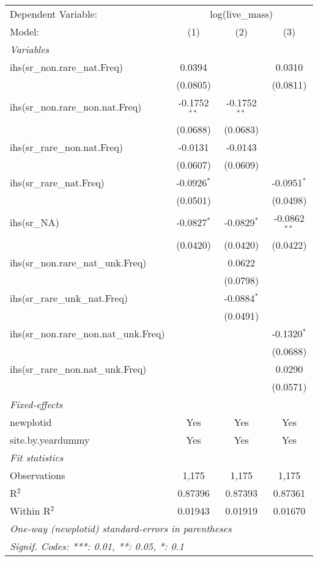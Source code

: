 \begin{tabular}{lccc}
\tabularnewline\midrule\midrule
Dependent Variable:&\multicolumn{3}{c}{log(live\_mass)}\\
Model:&(1) & (2) & (3)\\
\midrule \emph{Variables}&   &   &  \\
ihs(sr\_non.rare\_nat.Freq)&0.0394 &    & 0.0310\\
  &(0.0805) &    & (0.0811)\\
ihs(sr\_non.rare\_non.nat.Freq)&-0.1752$^{**}$ & -0.1752$^{**}$ &   \\
  &(0.0688) & (0.0683) &   \\
ihs(sr\_rare\_non.nat.Freq)&-0.0131 & -0.0143 &   \\
  &(0.0607) & (0.0609) &   \\
ihs(sr\_rare\_nat.Freq)&-0.0926$^{*}$ &    & -0.0951$^{*}$\\
  &(0.0501) &    & (0.0498)\\
ihs(sr\_NA)&-0.0827$^{*}$ & -0.0829$^{*}$ & -0.0862$^{**}$\\
  &(0.0420) & (0.0420) & (0.0422)\\
ihs(sr\_non.rare\_nat\_unk.Freq)&   & 0.0622 &   \\
  &   & (0.0798) &   \\
ihs(sr\_rare\_unk\_nat.Freq)&   & -0.0884$^{*}$ &   \\
  &   & (0.0491) &   \\
ihs(sr\_non.rare\_non.nat\_unk.Freq)&   &    & -0.1320$^{*}$\\
  &   &    & (0.0688)\\
ihs(sr\_rare\_non.nat\_unk.Freq)&   &    & 0.0290\\
  &   &    & (0.0571)\\
\midrule \emph{Fixed-effects}&   &   &  \\
newplotid & Yes & Yes & Yes\\
site.by.yeardummy & Yes & Yes & Yes\\
\midrule \emph{Fit statistics}&  & & \\
Observations & 1,175&1,175&1,175\\
R$^2$ & 0.87396&0.87393&0.87361\\
Within R$^2$ & 0.01943&0.01919&0.01670\\
\midrule\midrule\multicolumn{4}{l}{\emph{One-way (newplotid) standard-errors in parentheses}}\\
\multicolumn{4}{l}{\emph{Signif. Codes: ***: 0.01, **: 0.05, *: 0.1}}\\
\end{tabular}


